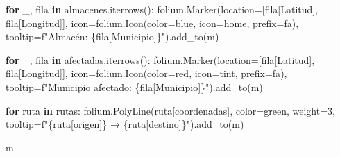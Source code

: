 \documentclass[
  spanish,
  us-letterpaper,
]{scrreprt}
\newenvironment{Shaded}{\begin{snugshade}}{\end{snugshade}}
\newcommand{\ControlFlowTok}[1]{\textcolor[rgb]{0.00,0.23,0.31}{\textbf{#1}}}
\newcommand{\DecValTok}[1]{\textcolor[rgb]{0.68,0.00,0.00}{#1}}
\newcommand{\KeywordTok}[1]{\textcolor[rgb]{0.00,0.23,0.31}{\textbf{#1}}}
\newcommand{\NormalTok}[1]{\textcolor[rgb]{0.00,0.23,0.31}{#1}}
\newcommand{\OperatorTok}[1]{\textcolor[rgb]{0.37,0.37,0.37}{#1}}
\newcommand{\SpecialCharTok}[1]{\textcolor[rgb]{0.37,0.37,0.37}{#1}}
\newcommand{\SpecialStringTok}[1]{\textcolor[rgb]{0.13,0.47,0.30}{#1}}
\newcommand{\StringTok}[1]{\textcolor[rgb]{0.13,0.47,0.30}{#1}}
\numberwithin{equation}{chapter} %
\begin{document}
\begin{Shaded}
\begin{Highlighting}[]
\ControlFlowTok{for}\NormalTok{ \_, fila }\KeywordTok{in}\NormalTok{ almacenes.iterrows():}
\NormalTok{    folium.Marker(location}\OperatorTok{=}\NormalTok{[fila[}\StringTok{\textquotesingle{}Latitud\textquotesingle{}}\NormalTok{],}
\NormalTok{     fila[}\StringTok{\textquotesingle{}Longitud\textquotesingle{}}\NormalTok{]],}
\NormalTok{                  icon}\OperatorTok{=}\NormalTok{folium.Icon(color}\OperatorTok{=}\StringTok{\textquotesingle{}blue\textquotesingle{}}\NormalTok{,}
\NormalTok{                   icon}\OperatorTok{=}\StringTok{\textquotesingle{}home\textquotesingle{}}\NormalTok{, prefix}\OperatorTok{=}\StringTok{\textquotesingle{}fa\textquotesingle{}}\NormalTok{),}
\NormalTok{                  tooltip}\OperatorTok{=}\SpecialStringTok{f"Almacén: }\SpecialCharTok{\{}\NormalTok{fila[}\StringTok{\textquotesingle{}Municipio\textquotesingle{}}\NormalTok{]}\SpecialCharTok{\}}\SpecialStringTok{"}\NormalTok{).add\_to(m)}

\ControlFlowTok{for}\NormalTok{ \_, fila }\KeywordTok{in}\NormalTok{ afectadas.iterrows():}
\NormalTok{    folium.Marker(location}\OperatorTok{=}\NormalTok{[fila[}\StringTok{\textquotesingle{}Latitud\textquotesingle{}}\NormalTok{],}
\NormalTok{     fila[}\StringTok{\textquotesingle{}Longitud\textquotesingle{}}\NormalTok{]],}
\NormalTok{        icon}\OperatorTok{=}\NormalTok{folium.Icon(color}\OperatorTok{=}\StringTok{\textquotesingle{}red\textquotesingle{}}\NormalTok{,}
\NormalTok{         icon}\OperatorTok{=}\StringTok{\textquotesingle{}tint\textquotesingle{}}\NormalTok{, prefix}\OperatorTok{=}\StringTok{\textquotesingle{}fa\textquotesingle{}}\NormalTok{),}
\NormalTok{        tooltip}\OperatorTok{=}\SpecialStringTok{f"Municipio afectado: }\SpecialCharTok{\{}\NormalTok{fila[}\StringTok{\textquotesingle{}Municipio\textquotesingle{}}\NormalTok{]}\SpecialCharTok{\}}\SpecialStringTok{"}\NormalTok{).add\_to(m)}

\ControlFlowTok{for}\NormalTok{ ruta }\KeywordTok{in}\NormalTok{ rutas:}
\NormalTok{    folium.PolyLine(ruta[}\StringTok{\textquotesingle{}coordenadas\textquotesingle{}}\NormalTok{],}
\NormalTok{     color}\OperatorTok{=}\StringTok{\textquotesingle{}green\textquotesingle{}}\NormalTok{, weight}\OperatorTok{=}\DecValTok{3}\NormalTok{,}
\NormalTok{        tooltip}\OperatorTok{=}\SpecialStringTok{f"}\SpecialCharTok{\{}\NormalTok{ruta[}\StringTok{\textquotesingle{}origen\textquotesingle{}}\NormalTok{]}\SpecialCharTok{\}}\SpecialStringTok{ → }\SpecialCharTok{\{}\NormalTok{ruta[}\StringTok{\textquotesingle{}destino\textquotesingle{}}\NormalTok{]}\SpecialCharTok{\}}\SpecialStringTok{"}\NormalTok{).add\_to(m)}

\NormalTok{m}
\end{Highlighting}
\end{Shaded}
\end{document}
